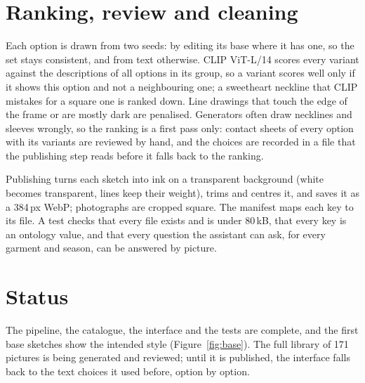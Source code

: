 \section{Ranking, review and cleaning}
Each option is drawn from two seeds: by editing its base where it has one, so the set stays consistent, and from text otherwise. CLIP ViT-L/14 \cite{radford2021clip} scores every variant against the descriptions of all options in its group, so a variant scores well only if it shows this option and not a neighbouring one; a sweetheart neckline that CLIP mistakes for a square one is ranked down. Line drawings that touch the edge of the frame or are mostly dark are penalised. Generators often draw necklines and sleeves wrongly, so the ranking is a first pass only: contact sheets of every option with its variants are reviewed by hand, and the choices are recorded in a file that the publishing step reads before it falls back to the ranking.

Publishing turns each sketch into ink on a transparent background (white becomes transparent, lines keep their weight), trims and centres it, and saves it as a 384\,px WebP; photographs are cropped square. The manifest maps each key to its file. A test checks that every file exists and is under 80\,kB, that every key is an ontology value, and that every question the assistant can ask, for every garment and season, can be answered by picture.

\section{Status}
The pipeline, the catalogue, the interface and the tests are complete, and the first base sketches show the intended style (Figure~\ref{fig:base}). The full library of 171 pictures is being generated and reviewed; until it is published, the interface falls back to the text choices it used before, option by option.
